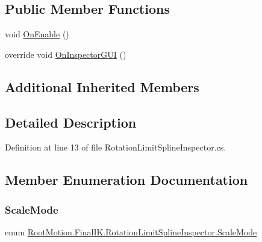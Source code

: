 \subsection*{Public Member Functions}
\begin{DoxyCompactItemize}
\item 
void \mbox{\hyperlink{class_root_motion_1_1_final_i_k_1_1_rotation_limit_spline_inspector_aa5f231d913400a834bf5bec508ab95b0}{On\+Enable}} ()
\item 
override void \mbox{\hyperlink{class_root_motion_1_1_final_i_k_1_1_rotation_limit_spline_inspector_aa3babc54f54cda37f60343ceb42c8009}{On\+Inspector\+G\+UI}} ()
\end{DoxyCompactItemize}
\subsection*{Additional Inherited Members}


\subsection{Detailed Description}


Definition at line 13 of file Rotation\+Limit\+Spline\+Inspector.\+cs.



\subsection{Member Enumeration Documentation}
\mbox{\label{class_root_motion_1_1_final_i_k_1_1_rotation_limit_spline_inspector_a6c3cce5f48375afcc33c2949d65288f3}} 
\subsubsection{\texorpdfstring{Scale\+Mode}{ScaleMode}}
{\footnotesize\ttfamily enum \mbox{\hyperlink{class_root_motion_1_1_final_i_k_1_1_rotation_limit_spline_inspector_a6c3cce5f48375afcc33c2949d65288f3}{Root\+Motion.\+Final\+I\+K.\+Rotation\+Limit\+Spline\+Inspector.\+Scale\+Mode}}\hspace{0.3cm}{\ttfamily [strong]}}

